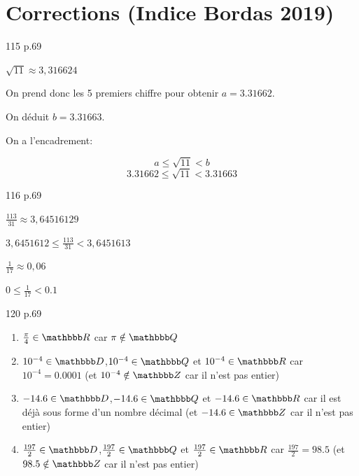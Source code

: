 \documentclass[10pt,a4paper,openany,twoside,prof]{book}
\begin{document}

\section*{Corrections (Indice Bordas 2019)}
\begin{bookexo}{115 p.69}\end{bookexo}
$\sqrt{11}\approx 3,316624$

On prend donc les 5 premiers chiffre pour obtenir $a=3.31662$.

On déduit $b=3.31663$.

On a l'encadrement:

$$a\le \sqrt{11} < b$$
$$3.31662\le \sqrt{11} < 3.31663$$

\begin{bookexo}{116 p.69}\end{bookexo}
$\frac{113}{31}\approx 3,64516129$

$3,6451612\le\frac{113}{31}<3,6451613$

\bigskip
$\frac{1}{17} \approx 0,06$

$0\le\frac{1}{17}<0.1$
\bigskip

\begin{bookexo}{120 p.69}\end{bookexo}
\begin{enumerate}[label=\alph*)]
	\item $\frac{\pi}{4}\in\R$ car $\pi\notin\Q$
	\item $10^{-4}\in\D$,\quad $10^{-4}\in\Q$ et $10^{-4}\in\R$ car $10^{-4}=0.0001$ (et $10^{-4}\notin\Z$ car il n'est pas entier)
	\item $-14.6\in\D$,\quad $-14.6\in\Q$ et $-14.6\in\R$ car il est déjà sous forme d'un nombre décimal (et $-14.6\in\Z$ car il n'est pas entier)
	\item $\frac{197}{2}\in\D$,\quad $\frac{197}{2}\in\Q$ et $\frac{197}{2}\in\R$ car $\frac{197}{2} = 98.5$ (et $98.5\notin\Z$ car il n'est pas entier)
\end{enumerate}
\end{document}
